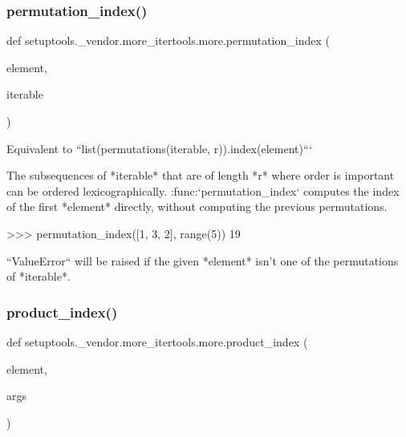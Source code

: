 \subsubsection{\texorpdfstring{permutation\+\_\+index()}{permutation\_index()}}
{\footnotesize\ttfamily def setuptools.\+\_\+vendor.\+more\+\_\+itertools.\+more.\+permutation\+\_\+index (\begin{DoxyParamCaption}\item[{}]{element,  }\item[{}]{iterable }\end{DoxyParamCaption})}

\begin{DoxyVerb}Equivalent to ``list(permutations(iterable, r)).index(element)```

The subsequences of *iterable* that are of length *r* where order is
important can be ordered lexicographically. :func:`permutation_index`
computes the index of the first *element* directly, without computing
the previous permutations.

    >>> permutation_index([1, 3, 2], range(5))
    19

``ValueError`` will be raised if the given *element* isn't one of the
permutations of *iterable*.
\end{DoxyVerb}
 \mbox{\label{namespacesetuptools_1_1__vendor_1_1more__itertools_1_1more_a4728a47a8a1ed85cf0312f1b1e05ea52}} 
\subsubsection{\texorpdfstring{product\+\_\+index()}{product\_index()}}
{\footnotesize\ttfamily def setuptools.\+\_\+vendor.\+more\+\_\+itertools.\+more.\+product\+\_\+index (\begin{DoxyParamCaption}\item[{}]{element,  }\item[{}]{args }\end{DoxyParamCaption})}

